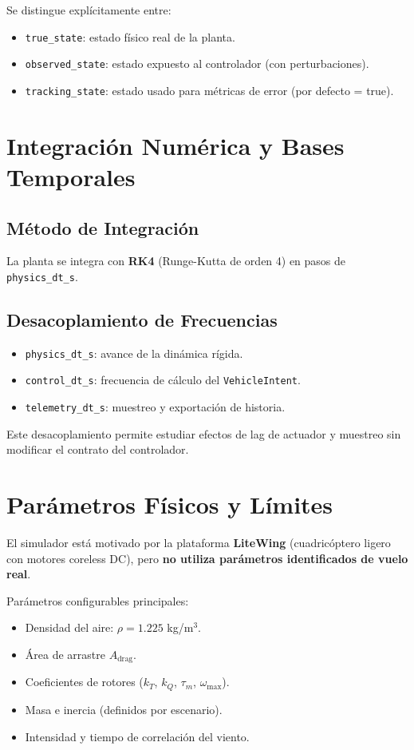 \documentclass[12pt,a4paper]{article}
\begin{document}
Se distingue explícitamente entre:
\begin{itemize}
    \item \texttt{true\_state}: estado físico real de la planta.
    \item \texttt{observed\_state}: estado expuesto al controlador (con perturbaciones).
    \item \texttt{tracking\_state}: estado usado para métricas de error (por defecto = true).
\end{itemize}

\section{Integración Numérica y Bases Temporales}

\subsection{Método de Integración}

La planta se integra con \textbf{RK4} (Runge-Kutta de orden 4) en pasos de \texttt{physics\_dt\_s}.

\subsection{Desacoplamiento de Frecuencias}

\begin{itemize}
    \item \texttt{physics\_dt\_s}: avance de la dinámica rígida.
    \item \texttt{control\_dt\_s}: frecuencia de cálculo del \texttt{VehicleIntent}.
    \item \texttt{telemetry\_dt\_s}: muestreo y exportación de historia.
\end{itemize}

Este desacoplamiento permite estudiar efectos de lag de actuador y muestreo sin modificar el contrato del controlador.

\section{Parámetros Físicos y Límites}

El simulador está motivado por la plataforma \textbf{LiteWing} (cuadricóptero ligero con motores coreless DC), pero \textbf{no utiliza parámetros identificados de vuelo real}.

Parámetros configurables principales:
\begin{itemize}
    \item Densidad del aire: $\rho = 1.225$ kg/m$^3$.
    \item Área de arrastre $A_{\text{drag}}$.
    \item Coeficientes de rotores ($k_T$, $k_Q$, $\tau_m$, $\omega_{\max}$).
    \item Masa e inercia (definidos por escenario).
    \item Intensidad y tiempo de correlación del viento.
\end{itemize}
\end{document}
